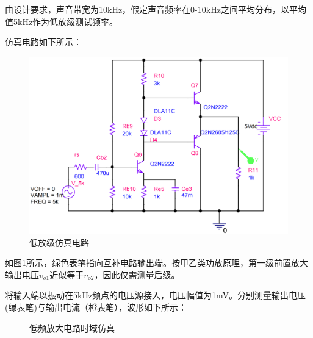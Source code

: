 \documentclass[a4paper,12pt,twoside]{article}
\begin{document}
 由设计要求，声音带宽为10kHz，假定声音频率在0-10kHz之间平均分布，以平均值5kHz作为低放级测试频率。

仿真电路如下所示：
\begin{figure}[H]
    \centering
    \includegraphics[scale=0.16]{低放仿真.png}
    \caption{低放级仿真电路}
    \label{低放仿真电路}
\end{figure}
如图\ref{低放仿真电路}所示，绿色表笔指向互补电路输出端。按甲乙类功放原理，第一级前置放大输出电压$v_{o1}$近似等于$v_{o2}$，因此仅需测量后级。

将输入端以振动在5kHz频点的电压源接入，电压幅值为1mV。分别测量输出电压(绿表笔)与输出电流（橙表笔），波形如下所示：
\begin{figure}[H]
    \centering
     \hspace{0.01\linewidth}
    \caption{低频放大电路时域仿真}
  \label{低放时域}
\end{figure}
\end{document}
